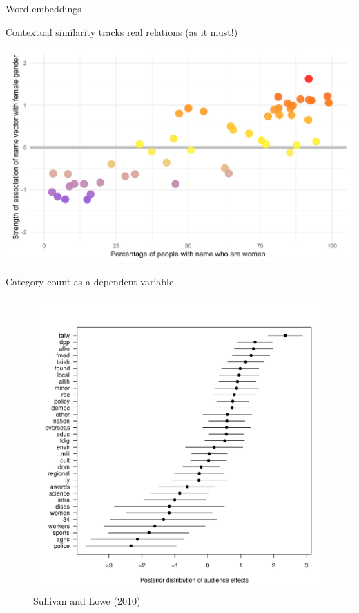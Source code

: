 \documentclass{hertieteaching}
\begin{document}
\begin{frame}{Word embeddings}
\protect\hypertarget{word-embeddings}{}

Contextual similarity tracks real relations (as it must!)

\begin{center}\includegraphics[width=0.9\linewidth]{pictures/cbn-jobs} \end{center}

\end{frame}

\begin{frame}{Category count as a dependent variable}
\protect\hypertarget{category-count-as-a-dependent-variable}{}

\begin{figure}

{\centering \includegraphics[width=0.8\linewidth]{pictures/indep-ref} 

}

\caption{Sullivan and Lowe (2010)}\label{fig:unnamed-chunk-12}
\end{figure}

\end{frame}
\end{document}

